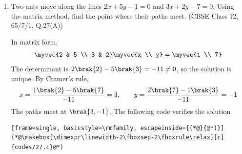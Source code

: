 \begin{enumerate}[label=\thesubsection.\arabic*, ref=\thesubsection.\theenumi]
\solution
Each block is equally likely, so the pmf is $\pr{X=x} = \frac{\text{number of blocks marked } x}{10}$:
\begin{table}[H]
	\centering
	\begin{tabular}{|c|c|c|c|c|}
		\hline
		$x$ & $0$ & $1$ & $2$ & $3$ \\ \hline
		$\pr{X=x}$ & $\frac{2}{10}$ & $\frac{3}{10}$ & $\frac{4}{10}$ & $\frac{1}{10}$ \\ \hline
	\end{tabular}
	\caption{Probability mass function of $X$}
	\label{tab:CBSE12-q25}
\end{table}
The probabilities sum to $1$. In terms of the unit impulse $\delta\sbrak{n}$ and the $z$-transform,
\begin{align}
	p\sbrak{n} &= \frac{2\delta\sbrak{n} + 3\delta\sbrak{n-1} + 4\delta\sbrak{n-2} + \delta\sbrak{n-3}}{10}
	\\
	\implies P\brak{z} &= \sum_n p\sbrak{n}z^{-n} = \frac{2 + 3z^{-1} + 4z^{-2} + z^{-3}}{10}
\end{align}
Then $P\brak{1} = 1$, and differentiating $P\brak{z}$ gives the mean,
\begin{align}
	E\sbrak{X} = \sum_n n\,p\sbrak{n} = -\left.\frac{dP\brak{z}}{dz}\right|_{z=1}
	= \frac{3 + 8 + 3}{10} = \frac{14}{10} = 1.4
\end{align}
The following code verifies the solution
\begin{lstlisting}[frame=single, basicstyle=\rmfamily, escapeinside={(*@}{@*)}]
(*@\makebox[\dimexpr\linewidth-2\fboxsep-2\fboxrule\relax][c]{codes/25.c}@*)
\end{lstlisting}

\item
Two ants move along the lines $2x + 5y - 1 = 0$ and $3x + 2y - 7 = 0$. Using the matrix method, find the point where their paths meet.
\hfill (CBSE Class 12, 65/7/1, Q.27(A))

\solution
In matrix form,
\begin{align}
	\myvec{2 & 5 \\ 3 & 2}\myvec{x \\ y} = \myvec{1 \\ 7}
\end{align}
The determinant is $2\brak{2} - 5\brak{3} = -11 \neq 0$, so the solution is unique. By Cramer's rule,
\begin{align}
	x = \frac{1\brak{2} - 5\brak{7}}{-11} = 3, \qquad y = \frac{2\brak{7} - 1\brak{3}}{-11} = -1
\end{align}
The paths meet at $\brak{3,-1}$.
The following code verifies the solution
\begin{lstlisting}[frame=single, basicstyle=\rmfamily, escapeinside={(*@}{@*)}]
(*@\makebox[\dimexpr\linewidth-2\fboxsep-2\fboxrule\relax][c]{codes/27.c}@*)
\end{lstlisting}


\end{enumerate}
